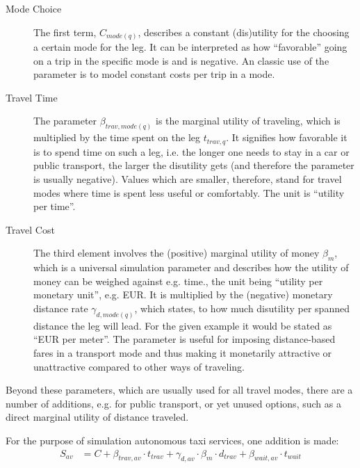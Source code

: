 \begin{description}

\item[Mode Choice] The first term, $C_{mode(q)}$, describes a constant (dis)utility for the
choosing a certain mode for the leg. It can be interpreted as how ``favorable''
going on a trip in the specific mode is and is negative. An classic use of the parameter
is to model constant costs per trip in a mode.

\item[Travel Time] The parameter $\beta_{trav,mode(q)}$ is the marginal utility of traveling,
which is multiplied by the time spent on the leg $t_{trav,q}$. It signifies how
favorable it is to spend time on such a leg, i.e. the longer one needs to stay
in a car or public transport, the larger the disutility gets (and therefore
the parameter is usually negative). Values which are smaller, therefore,
stand for travel modes where time is spent less useful or comfortably. The unit is
``utility per time''.

\item[Travel Cost] The third element involves the (positive) marginal utility of money $\beta_{m}$,
which is a universal simulation parameter and describes how the utility of money can
be weighed against e.g. time., the unit being ``utility per monetary unit'', e.g. EUR.
It is multiplied by the (negative) monetary distance rate
$\gamma_{d,mode(q)}$, which states, to how much disutility per spanned
distance the leg will lead. For the given example it would be stated as ``EUR per meter''.
The parameter is useful for imposing distance-based
fares in a transport mode and thus making it monetarily attractive or
unattractive compared to other ways of traveling.

\end{description}

Beyond these parameters, which are usually used for all travel modes, there are
a number of additions, e.g. for public transport, or yet unused options, such
as a direct marginal utility of distance traveled.

For the purpose of simulation autonomous taxi services, one addition is made:
\begin{equation}\begin{aligned}
S_{av} &= C + \beta_{trav,av} \cdot t_{trav} + \gamma_{d,av} \cdot \beta_m \cdot d_{trav} + \beta_{wait,av} \cdot t_{wait}
\end{aligned}\end{equation}

